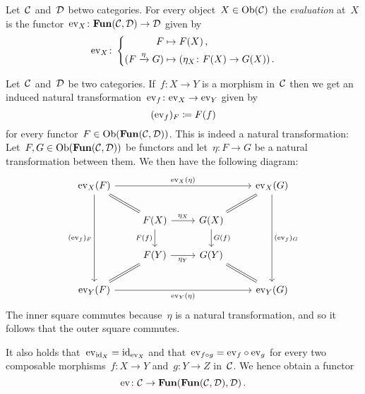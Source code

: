 \begin{definition}
  Let~$\mathcal{C}$ and~$\mathcal{D}$ betwo categories.
  For every object~$X \in \operatorname{Ob}(\mathcal{C})$ the \emph{evaluation} at~$X$ is the functor~$\mathrm{ev}_X \colon \mathbf{Fun}(\mathcal{C}, \mathcal{D}) \to \mathcal{D}$ given by
  \[
            \mathrm{ev}_X
    \colon  \left\{
              \begin{aligned}
                          F
                &\mapsto  F(X) \,,
                \\
                          (F \xrightarrow{\eta} G)
                &\mapsto  (\eta_X \colon F(X) \to G(X)) \,.
              \end{aligned}
            \right.
  \]
\end{definition}


\begin{remark}
  Let~$\mathcal{C}$ and~$\mathcal{D}$ be two categories.
  If~$f \colon X \to Y$ is a morphism in~$\mathcal{C}$ then we get an induced natural transformation~$\mathrm{ev}_f \colon \mathrm{ev}_X \to \mathrm{ev}_Y$ given by
  \[
              (\mathrm{ev}_f)_F
    \coloneqq  F(f)
  \]
  for every functor~$F \in \operatorname{Ob}(\mathbf{Fun}(\mathcal{C}, \mathcal{D}))$.
  This is indeed a natural transformation:
  Let~$F, G \in \operatorname{Ob}(\mathbf{Fun}(\mathcal{C}, \mathcal{D}))$ be functors and let~$\eta \colon F \to G$ be a natural transformation between them.
  We then have the following diagram:
  \[
    \begin{tikzcd}
        \ev_X(F)
        \arrow{rrr}[above]{\ev_X(\eta)}
        \arrow{ddd}[left]{(\ev_f)_F}
        \arrow[equal]{dr}
      & {}
      & {}
      & \ev_X(G)
        \arrow{ddd}[right]{(\ev_f)_G}
        \arrow[equal]{dl}
      \\
        {}
      & F(X)
        \arrow{r}[above]{\eta_X}
        \arrow{d}[left]{F(f)}
      & G(X)
        \arrow{d}[right]{G(f)}
      & {}
      \\
        {}
      & F(Y)
        \arrow{r}[below]{\eta_Y}
      & G(Y)
      & {}
      \\
        \ev_Y(F)
        \arrow{rrr}[below]{\ev_Y(\eta)}
        \arrow[equal]{ur}
      & {}
      & {}
      & \ev_Y(G)
        \arrow[equal]{ul}
    \end{tikzcd}
  \]
  The inner square commutes because~$\eta$ is a natural transformation, and so it follows that the outer square commutes.
  
  It also holds that~$\mathrm{ev}_{\operatorname{id}_X} = \operatorname{id}_{\mathrm{ev}_X}$ and that~$\mathrm{ev}_{f \circ g} = \mathrm{ev}_f \circ \mathrm{ev}_g$ for every two composable morphisms~$f \colon X \to Y$ and~$g \colon Y \to Z$ in~$\mathcal{C}$.
  We hence obtain a functor
  \[
            \mathrm{ev}
    \colon  \mathcal{C}
    \to     \mathbf{Fun}( \mathbf{Fun}(\mathcal{C}, \mathcal{D}), \mathcal{D} ) \,.
  \]

\end{remark}




